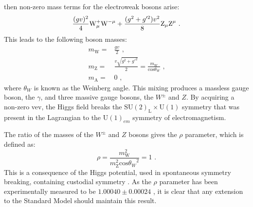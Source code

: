 %
\noindent then non-zero mass terms for the electroweak bosons arise:
%
\begin{equation}
\frac{(gv)^{2}}{4} \text{W}^{+}_{\mu} \text{W}^{-\mu} + \frac{(g^{2} + g'^{2})v^{2}}{8} \text{Z}_{\mu} \text{Z}^{\mu} \text{ .}\\
\end{equation}
%
\noindent This leads to the following boson masses:
%
\begin{equation}
\begin{aligned}
m_{\text{W}} = & \frac{gv}{2} \text{ ,} \\
m_{\text{Z}} = & \frac{v\sqrt{g^{2} + g'^{2}}}{2} = \frac{m_{W}}{\text{cos}{\theta_{W}}} \text{ ,} \\
m_{\text{A}} = & 0 \text{ ,}
\end{aligned}
\end{equation}
%
\noindent where $\theta_{W}$ is known as the Weinberg angle.  This mixing produces a massless gauge boson, the $\gamma$, and three massive gauge bosons, the $W^{\pm}$ and $Z$.  By acquiring a non-zero vev, the Higgs field breaks the $\text{SU}(2)_{\text{L}} \times \text{U}(1)$ symmetry that was present in the Lagrangian to the $\text{U}(1)_{em}$ symmetry of electromagnetism.  

The ratio of the masses of the $W^{\pm}$ and $Z$ bosons gives the $\rho$ parameter, which is defined as:
%
\begin{equation}
\rho = \frac{m_{\text{W}}^{2}}{m_{\text{Z}}^{2}\text{cos}{\theta_{W}}^{2}} = 1\text{ .}
\label{equ:custodialsymmetry}
\end{equation}
%
\noindent This is a consequence of the Higgs potential, used in spontaneous symmetry breaking, containing custodial symmetry \cite{Beringer:1900zz}.  As the $\rho$ parameter has been experimentally measured to be $1.00040 \pm 0.00024$ \cite{Agashe:2014kda}, it is clear that any extension to the Standard Model should maintain this result.



